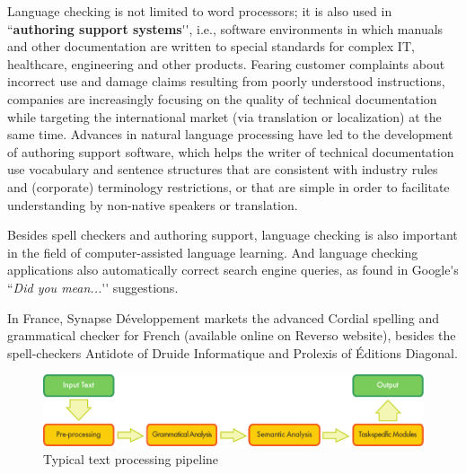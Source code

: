 \begin{multicols}{2}
Language checking is not limited to word processors; it is also used
in ``{\bf authoring support systems}{\mbox '}{\mbox '}, i.e., software environments in which
manuals and other documentation are written to special standards for
complex IT, healthcare, engineering and other products. Fearing
customer complaints about incorrect use and damage claims resulting
from poorly understood instructions, companies are increasingly
focusing on the quality of technical documentation while targeting the
international market (via translation or localization) at the same
time. Advances in natural language processing have led to the
development of authoring support software, which helps the writer of
technical documentation use vocabulary and sentence structures that
are consistent with industry rules and (corporate) terminology
restrictions, or that are simple in order to facilitate understanding
by non-native speakers or translation.

Besides spell checkers and authoring support, language checking is
also important in the field of computer-assisted language
learning. And language checking applications also automatically
correct search engine queries, as found in Google{\mbox '}s ``{\it Did you mean...}{\mbox '}{\mbox '}
suggestions.

In France, Synapse Développement markets the advanced Cordial spelling
and grammatical checker for French (available online on Reverso
website), besides the spell-checkers Antidote of Druide Informatique
and Prolexis of Éditions Diagonal.

\begin{figure}[htb]
\begin{center}
 \includegraphics[width=\textwidth]{../_media/english/text_processing_app_architecture}
\caption{Typical text processing pipeline}
\label{fig:textprocarchiEng}
\end{center}
\end{figure}


\end{multicols}
